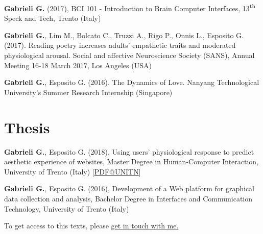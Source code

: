 \documentclass[a4paper]{deedy-resume} %
\begin{document}
\begin{minipage}[t]{0.63\textwidth}
\begin{tightitemize}
		\item \textbf{Gabrieli G.} (2017), BCI 101 - Introduction to Brain Computer Interfaces, 13\textsuperscript{th} Speck and Tech, Trento (Italy)
		\item \textbf{Gabrieli G.}, Lim M., Bolcato C., Truzzi A., Rigo P., Onnis L., Esposito G. (2017). Reading poetry increases adults' empathetic traits and moderated physiological arousal. Social and affective Neuroscience Society (SANS), Annual Meeting 16-18 March 2017, Los Angeles (USA)
		\item  \textbf{Gabrieli G.}, Esposito G. (2016). The Dynamics of Love. Nanyang Technological University's Summer Research Internship (Singapore)
	\end{tightitemize}
	
	
	\sectionspace
	\section{Thesis}
	\sectionspace
	\begin{tightitemize}
	    \item \textbf{Gabrieli G.}, Esposito G. (2018), Using users' physiological response to predict aesthetic experience of websites, Master Degree in Human-Computer Interaction, University of Trento (Italy) [\href{http://www5.unitn.it/Biblioteca/it/Web/RichiestaConsultazioneTesi/364090}{PDF@UNITN}]
	    
	    \item \textbf{Gabrieli G.}, Esposito G. (2016), Development of a Web platform for graphical data collection and analysis, Bachelor Degree in Interfaces and Communication Technology, University of Trento (Italy)
	    
	\end{tightitemize}
	
	\sectionspace
	\small{To get access to this texts, please \href{mailto:gack94@gmail.com}{get in touch with me.}}
\end{minipage} %
\end{document}
